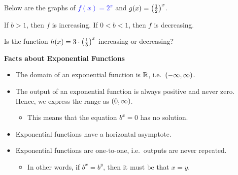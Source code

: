 \documentclass[12pt]{article}
\begin{document}
\vspace{5mm}


\newpage 

Below are the graphs of \textcolor{blue}{$f(x)=2^x$} and \textcolor{red}{$g(x)=\left( \frac{1}{2} \right)^x$}.

\begin{center}
\end{center}

If $b>1$, then $f$ is increasing. If $0<b<1$, then $f$ is decreasing.

\vspace{5mm}

\Example Is the function $h(x)=3\cdot\left(\frac{1}{5}\right)^x$ increasing or decreasing?

\vspace{15mm}

\textbf{Facts about Exponential Functions}
\begin{itemize}
	\item The domain of an exponential function is $\mathbb{R}$, i.e.\ $\left(-\infty,\infty\right)$.
	\item The output of an exponential function is always positive and never zero. Hence, we express the range as $\left( 0,\infty\right)$.
	\begin{itemize}
		\item This means that the equation $b^x=0$ has no solution.
	\end{itemize}
	\item Exponential functions have a horizontal asymptote.
	\item Exponential functions are one-to-one, i.e.\ outputs are never repeated.
	\begin{itemize}
		\item In other words, if $b^x=b^y$, then it must be that $x=y$.
	\end{itemize}
\end{itemize}
\end{document}
